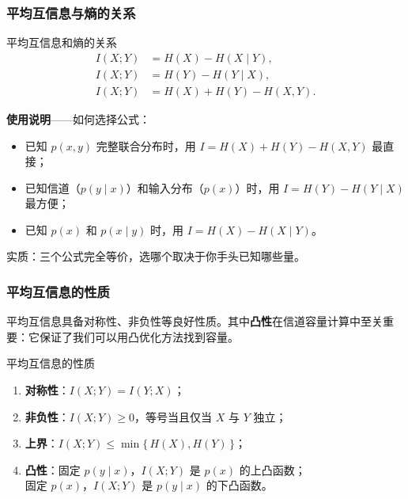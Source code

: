 \subsubsection{平均互信息与熵的关系}
\begin{formulaBox}{平均互信息和熵的关系}
\begin{align*}
  I(X;Y) &= H(X) - H(X \mid Y), \\
  I(X;Y) &= H(Y) - H(Y \mid X), \\
  I(X;Y) &= H(X) + H(Y) - H(X,Y).
\end{align*}
\end{formulaBox}

\noindent \textbf{使用说明}——如何选择公式：\\[2pt]
\begin{itemize}
  \item 已知 $p(x,y)$ 完整联合分布时，用 $I = H(X)+H(Y)-H(X,Y)$ 最直接；
  \item 已知信道（$p(y\mid x)$）和输入分布（$p(x)$）时，用 $I = H(Y)-H(Y\mid X)$ 最方便；
  \item 已知 $p(x)$ 和 $p(x\mid y)$ 时，用 $I = H(X)-H(X\mid Y)$。\\
\end{itemize}
实质：三个公式完全等价，选哪个取决于你手头已知哪些量。

\subsubsection{平均互信息的性质}

平均互信息具备对称性、非负性等良好性质。其中\textbf{凸性}在信道容量计算中至关重要：它保证了我们可以用凸优化方法找到容量。

\begin{theoremBox}{平均互信息的性质}
\begin{enumerate}
  \item \textbf{对称性}：$I(X;Y)=I(Y;X)$；
  \item \textbf{非负性}：$I(X;Y) \ge 0$，等号当且仅当 $X$ 与 $Y$ 独立；
  \item \textbf{上界}：$I(X;Y) \le \min\{\,H(X),H(Y)\,\}$；
  \item \textbf{凸性}：固定 $p(y\mid x)$，$I(X;Y)$ 是 $p(x)$ 的上凸函数；\\
        \hspace*{2em} 固定 $p(x)$，$I(X;Y)$ 是 $p(y\mid x)$ 的下凸函数。
\end{enumerate}
\end{theoremBox}

